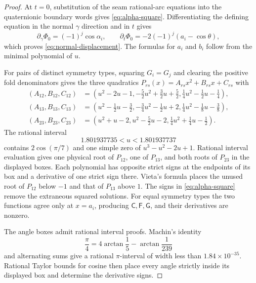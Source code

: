 \documentclass[11pt,reqno]{amsart}
\theoremstyle{plain}
\theoremstyle{definition}
\begin{document}
\begin{proof}
At $t=0$, substitution of the seam rational-arc equations into the quaternionic boundary words
gives \eqref{eq:alpha-square}.  Differentiating the defining equation in the normal $\gamma$
direction and in $t$ gives
\[
 \partial_\gamma\Phi_0=(-1)^j\cos\alpha_i,
 \qquad
 \partial_t\Phi_0=-2(-1)^j(a_i-\cos\theta),
\]
which proves \eqref{eq:normal-displacement}.  The formulas for $a_i$ and $b_i$ follow from the
minimal polynomial of $u$.

For pairs of distinct symmetry types, squaring $G_i=G_j$ and clearing the positive fold
denominators gives the three quadratics $P_{rs}(x)=A_{rs}x^2+B_{rs}x+C_{rs}$ with
\begin{align*}
 (A_{12},B_{12},C_{12})
 &=\left(u^2-2u-1,
   -\frac52u^2+\frac32u+\frac52,
   \frac14u^2-\frac12u-\frac14\right),\\
 (A_{13},B_{13},C_{13})
 &=\left(u^2-\frac12u-\frac32,
   -\frac34u^2-\frac12u+2,
   \frac14u^2-\frac18u-\frac38\right),\\
 (A_{23},B_{23},C_{23})
 &=\left(u^2+u-2,
   u^2-\frac52u-2,
   \frac14u^2+\frac14u-\frac12\right).
\end{align*}
The rational interval
\[
 1.801937735<u<1.801937737
\]
contains $2\cos(\pi/7)$ and one simple zero of $u^3-u^2-2u+1$.  Rational interval evaluation
gives one physical root of $P_{12}$, one of $P_{13}$, and both roots of $P_{23}$ in the displayed
boxes.  Each polynomial has opposite strict signs at the endpoints of its box and a derivative of
one strict sign there.  Vieta's formula places the unused root of $P_{12}$ below $-1$ and that of
$P_{13}$ above $1$.  The signs in \eqref{eq:alpha-square} remove the extraneous squared solutions.
For equal symmetry types the two functions agree only at $x=a_i$, producing
$\mathsf C,\mathsf F,\mathsf G$, and their derivatives are nonzero.

The angle boxes admit rational interval proofs.  Machin's identity
\[
 \frac\pi4=4\arctan\frac15-\arctan\frac1{239}
\]
and alternating sums give a rational $\pi$-interval of width less than
$1.84\times10^{-35}$.  Rational Taylor bounds for cosine then place every angle strictly inside
its displayed box and determine the derivative signs.
\end{proof}
\end{document}
